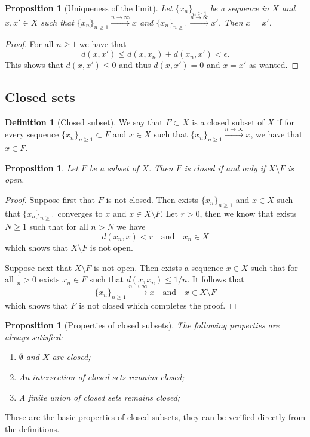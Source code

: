 \documentclass[11pt,a4paper]{article}
\theoremstyle{definition}
\newtheorem{definition}{Definition}[section]
\theoremstyle{plain}
\newtheorem{proposition}[theorem]{Proposition}
\newcommand{\tand}{\quad \text{and} \quad}
\begin{document}
  \begin{proposition}[Uniqueness of the limit]
    Let $\{x_n\}_{n \geq 1}$ be a sequence in $X$ and $x, x' \in X$ such
    that $\{x_n\}_{n \geq 1} \xrightarrow{n \to \infty} x$ and
    $\{x_n\}_{n \geq 1} \xrightarrow{n \to \infty} x'$. Then $x = x'$.
  \end{proposition}
  \begin{proof}
    For all $n \geq 1$ we have that
    \[
      d(x,x') \le d(x,x_n) + d(x_n,x') < \epsilon.
    \]
    This shows that $d(x,x') \le 0$ and thus $d(x,x') = 0$ and $x = x'$
    as wanted.
  \end{proof}
  
  \subsection{Closed sets}

  \begin{definition}[Closed subset]
    We say that $F \subset X$ is a closed subset of $X$ if for every
    sequence $\{x_n\}_{n \geq 1} \subset F$ and $x \in X$ such that
    $\{x_n\}_{n \geq 1} \xrightarrow{n \to \infty} x$, we have that
    $x \in F$.
  \end{definition}
  \begin{proposition}
    Let $F$ be a subset of $X$. Then $F$ is closed if and only if 
    $X \setminus F$ is open.
  \end{proposition}
  \begin{proof}
    Suppose first that $F$ is not closed. Then exists $\{x_n\}_{n \geq 1}$
    and $x \in X$ such that $\{x_n\}_{n \geq 1}$ converges to $x$
    and $x \in X \setminus F$. Let $r > 0$, then we know that exists
    $N \geq 1$ such that for all $n > N$ we have
    \[
      d(x_n,x) < r \tand x_n \in X
    \]
    which shows that $X \setminus F$ is not open.

    Suppose next that $X \setminus F$ is not open. Then exists a sequence
    $x \in X$ such that for all $\frac{1}{n} > 0$ exists
    $x_n \in F$ such that $d(x,x_n) \le 1/n$. It follows that
    \[
      \{x_n\}_{n \geq 1} \xrightarrow{n \to \infty} x \tand
      x \in X \setminus F
    \]
    which shows that $F$ is not closed which completes the proof.
  \end{proof}

  \begin{proposition}[Properties of closed subsets]
    The following properties are always satisfied:
    \begin{enumerate}
      \item[(1)] $\emptyset$ and $X$ are closed;
      \item[(2)] An intersection of closed sets remains closed;
      \item[(3)] A finite union of closed sets remains closed;
    \end{enumerate}
  \end{proposition}
  These are the basic properties of closed subsets, they can be verified
  directly from the definitions.
\end{document}
